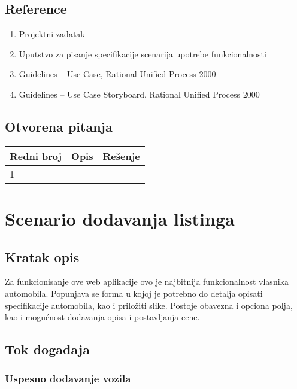 \documentclass[12pt]{article}
\begin{document}
\subsection{Reference}
\begin{enumerate}
   \item Projektni zadatak
   \item Uputstvo za pisanje specifikacije scenarija upotrebe funkcionalnosti
   \item  Guidelines – Use Case, Rational Unified Process 2000
   \item  Guidelines – Use Case Storyboard, Rational Unified Process 2000
 \end{enumerate}
\subsection{Otvorena pitanja}


\begin{center}
\begin{tabular}{ | m{2cm} | m{7cm}| m{7cm} | } 
\hline
Redni broj& Opis & Rešenje \\ 
\hline
1 &  & \\ 
\hline
\end{tabular}
\end{center}

    

\section{Scenario dodavanja listinga}
\subsection{Kratak opis}
Za funkcionisanje ove web aplikacije ovo je najbitnija funkcionalnost vlasnika
automobila. Popunjava se forma u kojoj je potrebno do detalja opisati specifikacije automobila, kao i priložiti slike. Postoje obavezna i opciona polja, kao i mogućnost dodavanja opisa i postavljanja cene.
\subsection{Tok događaja}

\subsubsection{Uspesno dodavanje vozila}
\end{document}
